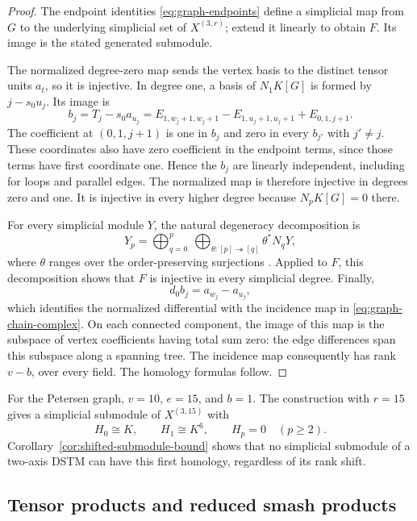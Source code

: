 \begin{proof}
The endpoint identities \eqref{eq:graph-endpoints} define a simplicial
map from $G$ to the underlying simplicial set of $X^{(3,r)}$; extend it
linearly to obtain $F$. Its image is the stated generated submodule.

The normalized degree-zero map sends the vertex basis to the distinct
tensor units $a_t$, so it is injective. In degree one, a basis of
$N_1K[G]$ is formed by
$j-s_0u_j$. Its image is
\begin{equation}\label{eq:graph-normalized-edges}
 b_j=T_j-s_0a_{u_j}
   =E_{1,w_j+1,w_j+1}-E_{1,u_j+1,u_j+1}+E_{0,1,j+1}.
\end{equation}
The coefficient at $(0,1,j+1)$ is one in $b_j$ and zero in every
$b_{j'}$ with $j'\neq j$. These coordinates also have zero coefficient
in the endpoint terms, since those terms have first coordinate one.
Hence the $b_j$ are linearly independent, including for loops and
parallel edges. The normalized map is therefore injective in degrees
zero and one. It is injective in every higher degree because
$N_pK[G]=0$ there.

For every simplicial module $Y$, the natural degeneracy decomposition is
\[
 Y_p=\bigoplus_{q=0}^p\ \bigoplus_{\theta:[p]\twoheadrightarrow[q]}
       \theta^*N_qY,
\]
where $\theta$ ranges over the order-preserving surjections
\cite[\S8.4]{Weibel}. Applied to $F$, this decomposition shows that $F$
is injective in every simplicial degree. Finally,
\[
 d_0b_j=a_{w_j}-a_{u_j},
\]
which identifies the normalized differential with the incidence map in
\eqref{eq:graph-chain-complex}. On each connected component, the image
of this map is the subspace of vertex coefficients having total sum
zero: the edge differences span this subspace along a spanning tree.
The incidence map consequently has rank $v-b$, over every field.
The homology formulas follow.
\end{proof}

\begin{example}\label{ex:petersen-homology}
For the Petersen graph, $v=10$, $e=15$, and $b=1$. The construction with
$r=15$ gives a simplicial submodule of $X^{(3,15)}$ with
\[
 H_0\cong K,\qquad H_1\cong K^6,
 \qquad H_p=0\quad(p\geq2).
\]
Corollary~\ref{cor:shifted-submodule-bound} shows that no simplicial
submodule of a two-axis DSTM can have this first homology, regardless of
its rank shift.
\end{example}

\subsection{Tensor products and reduced smash products}

